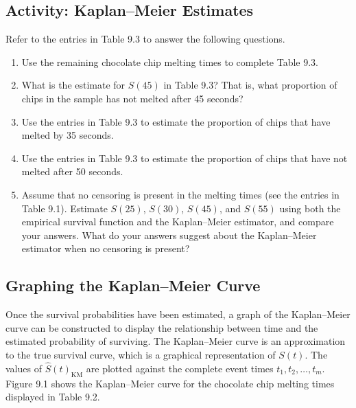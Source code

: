 \documentclass[
]{book}
\begin{document}
\hypertarget{activity-kaplanmeier-estimates}{%
\subsection*{Activity: Kaplan--Meier Estimates}\label{activity-kaplanmeier-estimates}}

Refer to the entries in Table 9.3 to answer the following questions.

\begin{enumerate}
\def\labelenumi{\arabic{enumi}.}
\setcounter{enumi}{12}
\item
  Use the remaining chocolate chip melting times to complete Table 9.3.
\item
  What is the estimate for \(S(45)\) in Table 9.3? That is, what proportion of chips in the sample has not melted after 45 seconds?
\item
  Use the entries in Table 9.3 to estimate the proportion of chips that have melted by 35 seconds.
\item
  Use the entries in Table 9.3 to estimate the proportion of chips that have not melted after 50 seconds.
\item
  Assume that no censoring is present in the melting times (see the entries in Table 9.1). Estimate \(S(25)\), \(S(30)\), \(S(45)\), and \(S(55)\) using both the empirical survival function and the Kaplan--Meier estimator, and compare your answers. What do your answers suggest about the Kaplan--Meier estimator when no censoring is present?
\end{enumerate}

\hypertarget{graphing-the-kaplanmeier-curve}{%
\subsection*{Graphing the Kaplan--Meier Curve}\label{graphing-the-kaplanmeier-curve}}

Once the survival probabilities have been estimated, a graph of the Kaplan--Meier curve can be constructed to display the relationship between time and the estimated probability of surviving. The Kaplan--Meier curve is an approximation to the true survival curve, which is a graphical representation of \(S(t)\). The values of \(\hat S(t)_{\mathrm{KM}}\) are plotted against the complete event times \(t_1, t_2, \dots, t_m\). Figure 9.1 shows the Kaplan--Meier curve for the chocolate chip melting times displayed in Table 9.2.
\end{document}
